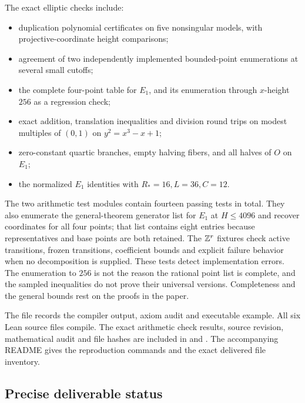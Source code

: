 The exact elliptic checks include:
\begin{itemize}
\item duplication polynomial certificates on five nonsingular models,
with projective-coordinate height comparisons;
\item agreement of two independently implemented bounded-point
enumerations at several small cutoffs;
\item the complete four-point table for $E_1$, and its enumeration through
$x$-height $256$ as a regression check;
\item exact addition, translation inequalities and division round trips
on modest multiples of $(0,1)$ on $y^2=x^3-x+1$;
\item zero-constant quartic branches, empty halving fibers, and all halves
of $O$ on $E_1$;
\item the normalized $E_1$ identities with $R_*=16,L=36,C=12$.
\end{itemize}
The two arithmetic test modules contain fourteen passing tests in total.
They also enumerate the general-theorem generator list for $E_1$ at
$H\le4096$ and recover coordinates for all four points; that list contains
eight entries because representatives and base points are both retained.
The $\mathbb Z^r$ fixtures check active transitions, frozen transitions, coefficient
bounds and explicit failure behavior when no decomposition is supplied.
These tests detect implementation errors. The enumeration to $256$ is
not the reason the rational point list is complete, and the sampled
inequalities do not prove their universal versions. Completeness and
the general bounds rest on the proofs in the paper.

The file  records the compiler output,
axiom audit and executable example. All six Lean source files compile.
The exact arithmetic check results,
source revision, mathematical audit and file hashes are included in
 and . The accompanying README gives
the reproduction commands and the exact delivered file inventory.

\subsection{Precise deliverable status}

